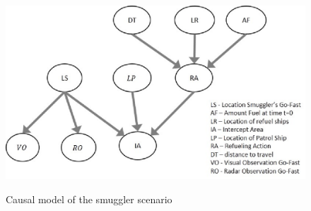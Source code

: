 \documentclass[conference]{IEEEtran}
\begin{document}

% 
% 
% 
% 
% 







\begin{figure}
\begin{center}
 \includegraphics[width=.4\textwidth]{causal-model.eps}\label{fig:causal-model}
 \caption{Causal model of the smuggler scenario}
\end{center}
\end{figure}
\end{document}
